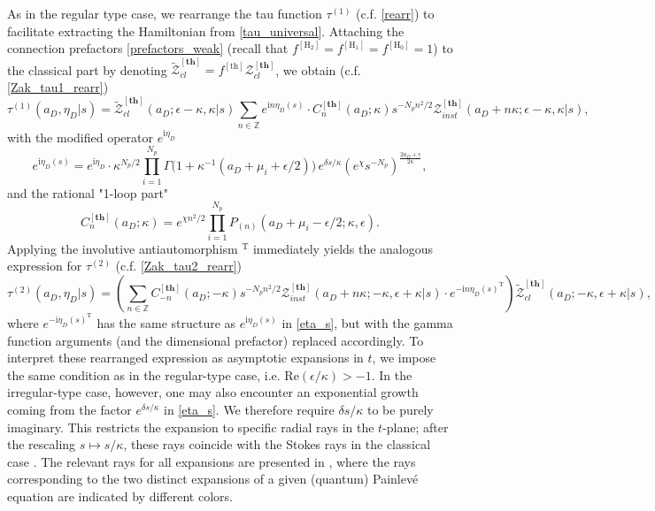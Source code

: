 \documentclass[12pt,a4paper]{article}
\numberwithin{equation}{section}
\newcommand{\ri}{\mathrm{i}}
\newcommand{\D}{\scriptscriptstyle{D}}
\begin{document}
As in the regular type case, we rearrange the tau function $\tau^{(1)}$ (c.f. \eqref{rearr}) to facilitate extracting the Hamiltonian from \eqref{tau_universal}. Attaching the connection prefactors \eqref{prefactors_weak} (recall that $f^{[\mathrm{H_2}]}=f^{\mathrm{[H_1]}}=f^{\mathrm{[H_0]}}=1$) to the classical part by denoting $\widetilde{\mathcal{Z}}_{cl}^{\mathbf{[th]}}=f^{[\mathrm{th}]}\mathcal{Z}_{cl}^{\mathbf{[th]}}$, we obtain (c.f. \eqref{Zak_tau1_rearr})
\begin{equation}\label{Zak_tau1_rearr_strong}
\tau^{(1)}(a_{\D},\eta_{\D}|s)=\widetilde{\mathcal{Z}}^{\mathbf{[th]}}_{cl}(a_{\D};\epsilon{-}\kappa,\kappa|s) \sum_{n\in\mathbb{Z}}e^{\ri n\eta_{\D}(s)}\cdot C_n^{\mathbf{[th]}}(a_{\D};\kappa)s^{-N_p n^2/2}\mathcal{Z}^{\mathbf{[th]}}_{inst}(a_{\D}{+}n\kappa;\epsilon{-}\kappa,\kappa|s),
\end{equation}
with the modified operator $e^{\ri\eta_{\D}}$
\begin{equation}\label{eta_s}
e^{\ri\eta_{\D}(s)}=e^{\ri\eta_{\D}}\cdot\kappa^{N_p/2}\prod\limits_{i=1}^{N_p}\Gamma\big(1+\kappa^{-1}(a_{\D}+\mu_i+\epsilon/2)\big)\,e^{\delta s/\kappa}\left(e^{\chi}s^{-N_p}\right)^{\frac{2a_{\D}{+}\epsilon}{2\kappa}},
\end{equation}
and the rational "1-loop part"
\begin{equation}\label{C_n_strong}
C_n^{\mathbf{[th]}}(a_{\D};\kappa)=e^{\chi n^2/2}\prod_{i=1}^{N_p}P_{(n)}(a_{\D}+\mu_i-\epsilon/2;\kappa,\epsilon).   
\end{equation}
Applying the involutive antiautomorphism $^\mathrm{T}$ immediately yields the analogous expression for $\tau^{(2)}$ (c.f. \eqref{Zak_tau2_rearr})
\begin{equation}\label{Zak_tau2_rearr_strong}
\tau^{(2)}(a_{\D},\eta_{\D}|s)= \left(\sum_{n\in\mathbb{Z}}C_{-n}^{\mathbf{[th]}}(a_{\D};-\kappa)s^{-N_p n^2/2}\mathcal{Z}^{\mathbf{[th]}}_{inst}(a_{\D}{+}n\kappa;-\kappa,\epsilon{+}\kappa|s) \cdot e^{-\ri n\eta_{\D}(s)^\mathrm{T}}\right)\widetilde{\mathcal{Z}}^{\mathbf{[th]}}_{cl}(a_{\D};-\kappa,\epsilon{+}\kappa|s),
\end{equation}
where
$e^{-\ri \eta_{\D}(s)^\mathrm{T}}$ has the same structure as $e^{\ri\eta_{\D}(s)}$ in \eqref{eta_s}, but with the gamma function arguments (and the dimensional prefactor) replaced accordingly.
To interpret these rearranged expression 
as asymptotic expansions in $t$, we impose the same condition as in the regular-type case, i.e. $\mathrm{Re}(\epsilon/\kappa)>-1$. In the irregular-type case, however, one may also encounter an exponential growth coming from the factor $e^{\delta s/\kappa}$ in \eqref{eta_s}. We therefore require $\delta s/\kappa$ to be purely imaginary. This restricts the expansion to specific radial rays in the $t$-plane; after the rescaling $s\mapsto s/\kappa$, these rays coincide with the Stokes rays in the classical case \cite{BLMST16}. The relevant rays for all expansions are presented in \cite[Fig. 3, Tab. 3]{BST25}, where the rays corresponding to the two distinct expansions of a given (quantum) Painlev\'e equation are indicated by different colors.  
\end{document}
